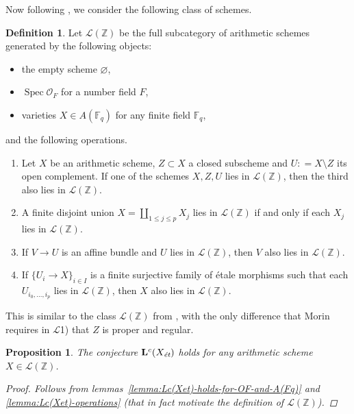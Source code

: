 \documentclass{article}
\DeclareMathOperator{\Spec}{Spec}
\newcommand{\FF}{\mathbb{F}}
\newcommand{\ZZ}{\mathbb{Z}}
\renewcommand{\emptyset}{\varnothing}
\newcommand{\et}{\text{\it ét}}
\newcommand{\dfn}{\mathrel{\mathop:}=}
\newtheorem{proposition}[theorem]{Proposition}
\theoremstyle{definition}
\newtheorem{definition}[theorem]{Definition}
\numberwithin{equation}{section}
\begin{document}
Now following \cite{Morin-2014}, we consider the following class of schemes.

\begin{definition}
  Let $\mathcal{L} (\ZZ)$ be the full subcategory of arithmetic schemes
  generated by the following objects:
  \begin{itemize}
  \item the empty scheme $\emptyset$,
  \item $\Spec \mathcal{O}_F$ for a number field $F$,
  \item varieties $X \in A (\FF_q)$ for any finite field $\FF_q$,
  \end{itemize}
  and the following operations.
  \begin{enumerate}
  \item[$\mathcal{L}$1)] Let $X$ be an arithmetic scheme, $Z \subset X$ a closed
    subscheme and $U \dfn X\setminus Z$ its open complement. If one of the
    schemes $X,Z,U$ lies in $\mathcal{L} (\ZZ)$, then the third also lies in
    $\mathcal{L} (\ZZ)$.

  \item[$\mathcal{L}$2)] A finite disjoint union
    $X = \coprod_{1 \le j \le p} X_j$ lies in $\mathcal{L} (\ZZ)$ if and only if
    each $X_j$ lies in $\mathcal{L} (\ZZ)$.

  \item[$\mathcal{L}$3)] If $V \to U$ is an affine bundle and $U$ lies in
    $\mathcal{L} (\ZZ)$, then $V$ also lies in $\mathcal{L} (\ZZ)$.

  \item[$\mathcal{L}$4)] If $\{ U_i \to X \}_{i \in I}$ is a finite surjective
    family of étale morphisms such that each $U_{i_0,\ldots,i_p}$ lies in
    $\mathcal{L} (\ZZ)$, then $X$ also lies in $\mathcal{L} (\ZZ)$.
  \end{enumerate}
\end{definition}

This is similar to the class $\mathcal{L} (\ZZ)$ from
\cite[Definition~5.9]{Morin-2014}, with the only difference that Morin requires
in $\mathcal{L}$1) that $Z$ is proper and regular.

\begin{proposition}
  The conjecture $\mathbf{L}^c (X_\et)$ holds for any arithmetic scheme
  $X \in \mathcal{L} (\ZZ)$.

  \begin{proof}
    Follows from lemmas~\ref{lemma:Lc(Xet)-holds-for-OF-and-A(Fq)} and
    \ref{lemma:Lc(Xet)-operations} (that in fact motivate the definition of
    $\mathcal{L} (\ZZ)$).
  \end{proof}
\end{proposition}
\end{document}
